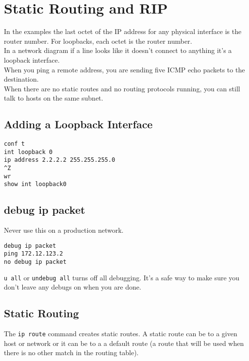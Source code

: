 \section{Static Routing and RIP}

In the examples the last octet of the IP address for any physical interface
is the router number. For loopbacks, each octet is the router number.\\

In a network diagram if a line looks like it doesn't connect to anything
it's a loopback interface.\\

When you ping a remote address, you are sending five ICMP echo packets to
the destination.\\

When there are no static routes and no routing protocols running, you can
still talk to hosts on the same subnet.

\subsection{Adding a Loopback Interface}

\begin{verbatim}
conf t
int loopback 0
ip address 2.2.2.2 255.255.255.0
^Z
wr
show int loopback0
\end{verbatim}

\subsection{debug ip packet}

Never use this on a production network.

\begin{verbatim}
debug ip packet
ping 172.12.123.2
no debug ip packet
\end{verbatim}

\texttt{u all} or \texttt{undebug all} turns off all debugging. It's a safe
way to make sure you don't leave any debugs on when you are done.

\subsection{Static Routing}

The \texttt{ip route} command creates static routes. A static route can
be to a given host or network or it can be to a a default route (a route that
will be used when there is no other match in the routing table).\\

